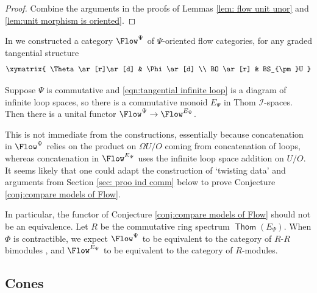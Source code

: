 \documentclass{TPmod}
\DeclareMathOperator{\Thom}{\mathsf{Thom}}
\newcommand{\cI}{\mathcal{I}}
\numberwithin{equation}{section}
\begin{document}
\begin{proof}
    Combine the arguments in the proofs of Lemmas \ref{lem: flow unit unor} and \ref{lem:unit morphism is oriented}.
\end{proof}

      In \cite{PS2} we constructed a category $\Flow^{\Psi}$ of $\Psi$-oriented flow categories, for any graded tangential structure
    \begin{equation} \label{eqn:tangential infinite loop}
    \xymatrix{
    \Theta \ar[r]\ar[d] & \Phi \ar[d] \\
    BO \ar[r] & BS_{\pm}U
    }
    \end{equation}
 
\begin{conj} \label{conj:compare models of Flow}
    Suppose $\Psi$ is commutative and \eqref{eqn:tangential infinite loop} is a diagram of infinite loop spaces, so there is a commutative monoid $E_\Psi$ in Thom $\cI$-spaces. Then there is a unital functor $\Flow^{\Psi} \to \Flow^{E_\Psi}$.
\end{conj}

\begin{rmk}
    This is not immediate from the constructions, essentially because concatenation in $\Flow^{\Psi}$ relies on the product on $\Omega U/O$ coming from concatenation of loops, whereas concatenation in $\Flow^{E_\Psi}$ uses the infinite loop space addition on $U/O$.  It seems likely that one could adapt the construction of `twisting data' and arguments from Section \ref{sec: proo ind comm} below to prove Conjecture \ref{conj:compare models of Flow}.

    In particular, the functor  of Conjecture \ref{conj:compare models of Flow} should not be an equivalence. Let $R$ be the commutative ring spectrum $\Thom(E_\Psi)$. When $\Phi$ is contractible, we expect $\Flow^\Psi$ to be equivalent to the category of $R$-$R$ bimodules \cite[Conjecture 5.10]{PS2}, and $\Flow^{E_\Psi}$ to be equivalent to the category of $R$-modules.
\end{rmk}

\subsection{Cones}
\end{document}
